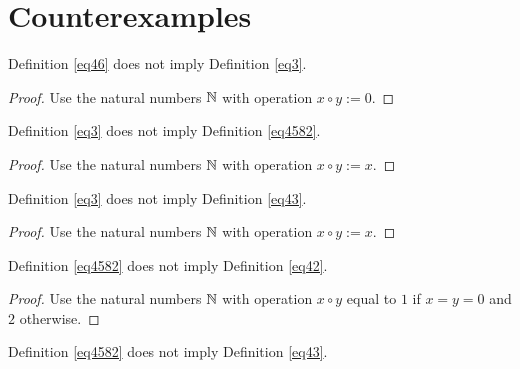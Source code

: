 \chapter{Counterexamples}

\begin{theorem}\label{46_not_imply_3}\leanok{} Definition \ref{eq46} does not imply Definition \ref{eq3}.
\end{theorem}

\begin{proof}\leanok Use the natural numbers $\mathbb{N}$ with operation $x \circ y := 0$.
\end{proof}

\begin{theorem}\label{3_not_imply_4582}\leanok{} Definition \ref{eq3} does not imply Definition \ref{eq4582}.
\end{theorem}

\begin{proof}\leanok Use the natural numbers $\mathbb{N}$ with operation $x \circ y := x$.
\end{proof}

\begin{theorem}\label{3_not_imply_43}\leanok{} Definition \ref{eq3} does not imply Definition \ref{eq43}.
\end{theorem}

\begin{proof}\leanok Use the natural numbers $\mathbb{N}$ with operation $x \circ y := x$.
\end{proof}

\begin{theorem}\label{4582_not_imply_42}\leanok{} Definition \ref{eq4582} does not imply Definition \ref{eq42}.
\end{theorem}

\begin{proof}\leanok Use the natural numbers $\mathbb{N}$ with operation
$x \circ y$ equal to $1$ if $x=y=0$ and $2$ otherwise.
\end{proof}

\begin{theorem}\label{4582_not_imply_43}\leanok{} Definition \ref{eq4582} does not imply Definition \ref{eq43}.
\end{theorem}

